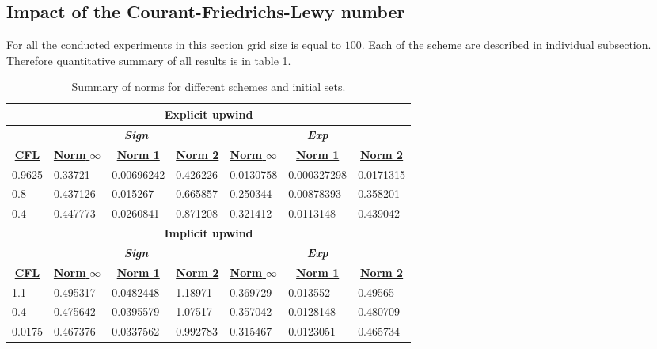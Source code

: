 \subsection{Impact of the Courant-Friedrichs-Lewy number} \label{sec:impactCFL}
	For all the conducted experiments in this section grid size is equal to $100$. Each of the scheme are described in individual subsection. Therefore quantitative summary of all results is in table \ref{tab:impactCFL}.
	
	
	
	
	
	
	\begin{table}[]
		\centering
		\caption{Summary of norms for different schemes and initial sets.}
		\label{tab:impactCFL}
				\begin{tabular}{|l|l|l|l|l|l|l|}
					\hline
					\multicolumn{7}{|c|}{\textbf{Explicit upwind}} \\ \hline
					& \multicolumn{3}{|c|}{\textit{\textbf{Sign}}} & \multicolumn{3}{|c|}{\textit{\textbf{Exp}}} \\ \hline
					\multicolumn{1}{|c|}{{\ul \textbf{CFL}}} & \multicolumn{1}{|c|}{{\ul \textbf{Norm }$\infty$}} & \multicolumn{1}{c}{{\ul \textbf{Norm 1}}} & \multicolumn{1}{|c|}{{\ul \textbf{Norm 2}}} & \multicolumn{1}{|c|}{{\ul \textbf{Norm }$\infty$}} & \multicolumn{1}{|c|}{{\ul \textbf{Norm 1}}} & \multicolumn{1}{|c|}{{\ul \textbf{Norm 2}}} \\ \hline \hline
					0.9625 & 0.33721 & 0.00696242 & 0.426226 & 0.0130758 & 0.000327298 & 0.0171315 \\ \hline
					0.8 & 0.437126 & 0.015267 & 0.665857 & 0.250344 & 0.00878393 & 0.358201 \\ \hline
					0.4 & 0.447773 & 0.0260841 & 0.871208 & 0.321412 & 0.0113148 & 0.439042 \\ \hline \hline
					
					\multicolumn{7}{|c|}{\textbf{Implicit upwind}} \\ \hline
					& \multicolumn{3}{|c|}{\textit{\textbf{Sign}}} & \multicolumn{3}{|c|}{\textit{\textbf{Exp}}} \\ \hline
					\multicolumn{1}{|c|}{{\ul \textbf{CFL}}} & \multicolumn{1}{|c|}{{\ul \textbf{Norm }$\infty$}} & \multicolumn{1}{|c|}{{\ul \textbf{Norm 1}}} & \multicolumn{1}{|c|}{{\ul \textbf{Norm 2}}} & \multicolumn{1}{|c|}{{\ul \textbf{Norm }$\infty$}} & \multicolumn{1}{|c|}{{\ul \textbf{Norm 1}}} & \multicolumn{1}{||c|}{{\ul \textbf{Norm 2}}} \\ \hline \hline
					1.1 & 0.495317 & 0.0482448 & 1.18971 & 0.369729 & 0.013552 & 0.49565 \\ \hline
					0.4 & 0.475642 & 0.0395579 & 1.07517 & 0.357042 & 0.0128148 & 0.480709 \\ \hline
					0.0175 & 0.467376 & 0.0337562 & 0.992783 & 0.315467 & 0.0123051 & 0.465734 \\ \hline \hline
					

\end{tabular}
\end{table}
